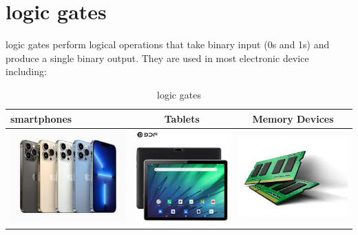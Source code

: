 \documentclass{article}
\begin{document}
	
	\section{logic gates}
	logic gates perform logical operations that take binary input (0s and 1s) and produce a single binary output. They are used in most electronic device including:
	
	\begin{table}[h!]
		\begin{center}
			\caption{logic gates}
			\label{tab:table 1}
			\begin{tabular}{|l|c|c|}
				\hline
				smartphones 
				& 
				Tablets 
				& 
				Memory Devices
				\\
				\hline
				\includegraphics[width=0.2\linewidth]{smartphones}
				&
				\includegraphics[width=0.2\linewidth]{tablets}
				&
				\includegraphics[width=0.25\linewidth]{memory devices}
				\\
				\hline
				
		\end{tabular}
		\end{center}
		\end{table}
	
\end{document}

